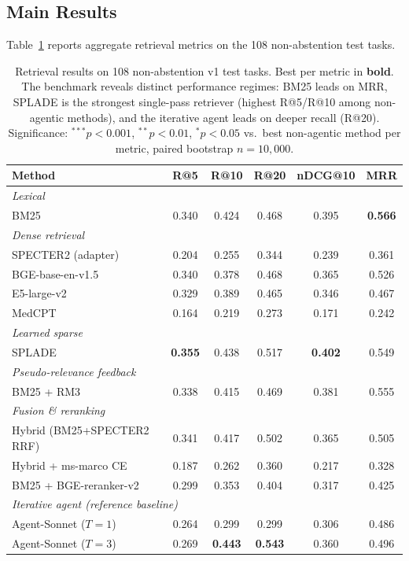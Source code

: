 \documentclass{article}
\begin{document}
\subsection{Main Results}

Table~\ref{tab:main} reports aggregate retrieval metrics on the 108 non-abstention test tasks.

\begin{table}[t]
\centering
\caption{Retrieval results on 108 non-abstention v1 test tasks. Best per metric in \textbf{bold}. The benchmark reveals distinct performance regimes: BM25 leads on MRR, SPLADE is the strongest single-pass retriever (highest R@5/R@10 among non-agentic methods), and the iterative agent leads on deeper recall (R@20). Significance: $^{***}p{<}0.001$, $^{**}p{<}0.01$, $^{*}p{<}0.05$ vs.\ best non-agentic method per metric, paired bootstrap $n{=}10{,}000$.}
\label{tab:main}
\small
\begin{tabular}{lccccc}
\toprule
\textbf{Method} & \textbf{R@5} & \textbf{R@10} & \textbf{R@20} & \textbf{nDCG@10} & \textbf{MRR} \\
\midrule
\multicolumn{6}{l}{\emph{Lexical}} \\
\quad BM25 & 0.340 & 0.424 & 0.468 & 0.395 & \textbf{0.566} \\
\midrule
\multicolumn{6}{l}{\emph{Dense retrieval}} \\
\quad SPECTER2 (adapter) & 0.204 & 0.255 & 0.344 & 0.239 & 0.361 \\
\quad BGE-base-en-v1.5 & 0.340 & 0.378 & 0.468 & 0.365 & 0.526 \\
\quad E5-large-v2 & 0.329 & 0.389 & 0.465 & 0.346 & 0.467 \\
\quad MedCPT & 0.164 & 0.219 & 0.273 & 0.171 & 0.242 \\
\midrule
\multicolumn{6}{l}{\emph{Learned sparse}} \\
\quad SPLADE~\cite{splade2022} & \textbf{0.355} & 0.438 & 0.517 & \textbf{0.402} & 0.549 \\
\midrule
\multicolumn{6}{l}{\emph{Pseudo-relevance feedback}} \\
\quad BM25 + RM3 & 0.338 & 0.415 & 0.469 & 0.381 & 0.555 \\
\midrule
\multicolumn{6}{l}{\emph{Fusion \& reranking}} \\
\quad Hybrid (BM25+SPECTER2 RRF) & 0.341 & 0.417 & 0.502 & 0.365 & 0.505 \\
\quad Hybrid + ms-marco CE & 0.187 & 0.262 & 0.360 & 0.217 & 0.328 \\
\quad BM25 + BGE-reranker-v2 & 0.299 & 0.353 & 0.404 & 0.317 & 0.425 \\
\midrule
\multicolumn{6}{l}{\emph{Iterative agent (reference baseline)}} \\
\quad Agent-Sonnet ($T{=}1$) & 0.264 & 0.299 & 0.299 & 0.306 & 0.486 \\
\quad Agent-Sonnet ($T{=}3$) & 0.269 & \textbf{0.443} & \textbf{0.543} & 0.360 & 0.496 \\
\bottomrule
\end{tabular}
\end{table}
\end{document}
